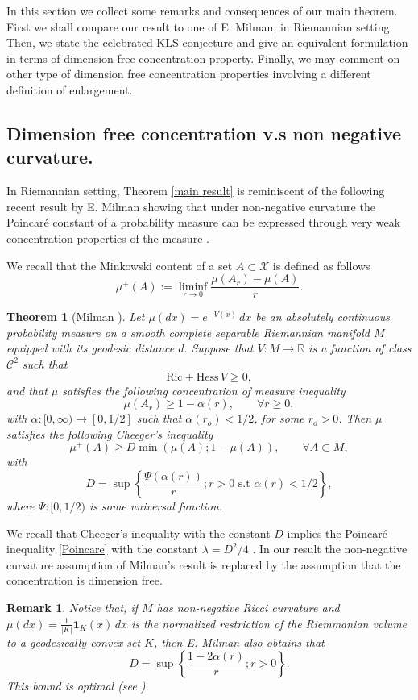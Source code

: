 \documentclass[11pt]{amsart}
\newtheorem{thm}[equation]{Theorem}
\newtheorem{rem}[equation]{Remark}
\numberwithin{equation}{section}
\begin{document}
In this section we collect some remarks and consequences of our main theorem.
First we shall compare our result to one of E. Milman, in Riemannian setting. Then, we state the celebrated KLS conjecture and give an equivalent formulation in terms of dimension free concentration property. Finally,
 we may comment on other type of dimension free concentration properties involving a different definition of enlargement.

\subsection{Dimension free concentration v.s non negative curvature.}
In Riemannian setting, Theorem \ref{main result} is reminiscent of the following recent result by E. Milman showing that under non-negative curvature the Poincar\'e constant of a probability measure can be expressed through very weak concentration properties of the measure \cite{Mil09a,Mil10}. 

We recall that the Minkowski content of a set $A \subset {\mathcal{X}}$ is defined as follows
\[
\mu^+(A) := \liminf_{r\to 0} \frac{\mu(A_r) - \mu(A)}{r}.
\]

\begin{thm}[Milman \cite{Mil10}]\label{Milman} Let $\mu(dx)=e^{-V(x)}\,dx$ be an absolutely continuous probability measure on a smooth complete separable Riemannian manifold $M$ equipped with its geodesic distance $d.$
Suppose that $V:M\to{\mathbb{R}}$ is a function of class $\mathcal{C}^2$ such that 
\[
\mathrm{Ric} + \mathrm{Hess}\,V \geq0,
\]
and that $\mu$ satisfies the following concentration of measure inequality
\[
\mu(A_r) \geq 1 - \alpha(r),\qquad \forall r\geq 0,
\]
with $\alpha:[0,\infty) \to [0,1/2]$ such that $\alpha(r_o)<1/2$, for some $r_o>0$. Then $\mu$ satisfies the following  Cheeger's inequality
\[
\mu^+(A)\geq D \min(\mu(A) ; 1-\mu(A)),\qquad \forall A \subset M,
\]
with 
\[
D=\sup\left\{ \frac{\Psi(\alpha(r))}{r} ; r>0 \text{ s.t } \alpha(r)<1/2\right\},
\]
where $\Psi:[0,1/2)$ is some universal function. 
\end{thm}
We recall that Cheeger's inequality with the constant $D$ implies the Poincar\'e inequality \eqref{Poincare} with the constant $\lambda=D^2/4$ \cite{Cheeger,Mazya}. In our result the non-negative curvature assumption of Milman's result is replaced by the assumption that the concentration is dimension free. 
\begin{rem}
Notice that, if $M$ has non-negative Ricci curvature and $\mu (dx) = \frac{1}{|K|} \mathbf{1}_K(x)\,dx$ is the normalized restriction of the Riemmanian volume to a  geodesically convex set $K$, then E. Milman also obtains \cite{Mil11} that 
\[
D= \sup\left\{\frac{1-2\alpha(r)}{r} ; r>0\right\}.
\]
This bound is optimal (see \cite{Mil11}).
\end{rem}
\end{document}
